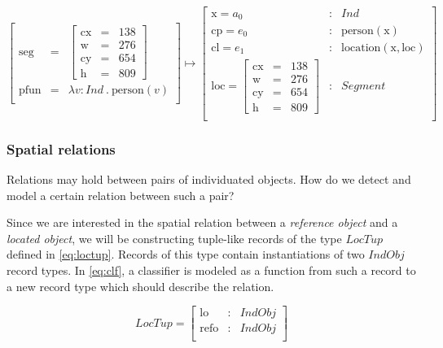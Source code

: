 \begin{equation}\label{eq:indfunrec}
\left[\begin{array}{rcl}
\text{seg} &=& \left[\begin{array}{rcl}
\text{cx} &=& 138\\
\text{w} &=& 276\\
\text{cy} &=& 654\\
\text{h} &=& 809
\end{array}\right]\\
\text{pfun} &=& \lambda v:Ind\ .\ \text{person}(v)\\
\end{array}\right]
\mapsto
\left[\begin{array}{lcl}
    \text{x} = a_0 &:& Ind \\
    \text{cp} = e_0 &:& \text{person}(\text{x}) \\
    \text{cl} = e_1 &:& \text{location}(\text{x}, \text{loc}) \\
    \text{loc} = \left[\begin{array}{rcl}
\text{cx} &=& 138\\
\text{w} &=& 276\\
\text{cy} &=& 654\\
\text{h} &=& 809
\end{array}\right] &:& Segment\\
\end{array}\right]
\end{equation}



\subsubsection{Spatial relations}

Relations may hold between pairs of individuated objects.
How do we detect and model a certain relation between such a pair?

Since we are interested in the spatial relation between a \textit{reference object} and a \textit{located object}, we will be constructing tuple-like records of the type $LocTup$ defined in \autoref{eq:loctup}.
Records of this type contain instantiations of two $IndObj$ record types.
In \autoref{eq:clf}, a classifier is modeled as a function from such a record to a new record type which should describe the relation.

\begin{equation}\label{eq:loctup}
LocTup = \left[\begin{array}{rcl}
    \text{lo} &:& IndObj \\
    \text{refo} &:& IndObj \\
    \end{array}\right]
\end{equation}

